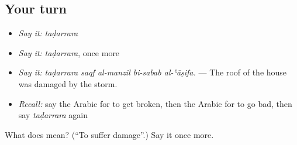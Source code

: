 \subsection*{Your turn}
\begin{itemize}
\raggedright
  \item \emph{Say it:} \emph{taḍarrara}
  \item \emph{Say it:} \emph{taḍarrara}, once more
  \item \emph{Say it:} \emph{taḍarrara saqf al-manzil bi-sabab al-ʿāṣifa.} — The roof of the house was damaged by the storm.
  \item \emph{Recall:} say the Arabic for to get broken, then the Arabic for to go bad, then say \emph{taḍarrara} again
\end{itemize}

\begin{tcolorbox}[breakable,colback=teal!4,colframe=teal!35!black,title={Before you move on}]
What does  mean? (\textquotedblleft{}To suffer damage\textquotedblright{}.) Say it once more.
\end{tcolorbox}
